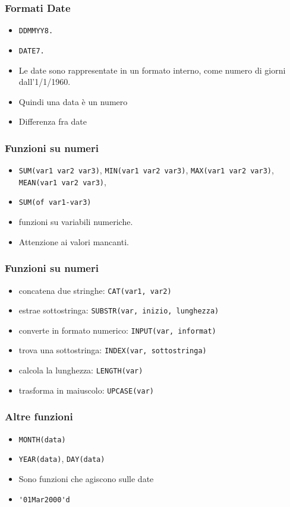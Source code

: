 \begin{frame}[fragile]\frametitle{Formati Date}
  \begin{itemize}
  \item
    \verb!DDMMYY8.!
  \item
    \verb!DATE7.!
  \item
    Le date sono rappresentate in un formato interno, come numero di giorni dall'1/1/1960.
  \item
    Quindi una data {\`e} un numero
  \item
    Differenza fra date
  \end{itemize}
\end{frame}

\begin{frame}[fragile]\frametitle{Funzioni su numeri}
  \begin{itemize}
  \item
    \verb!SUM(var1 var2 var3)!,  \verb!MIN(var1 var2 var3)!,
    \verb!MAX(var1 var2 var3)!,     \verb!MEAN(var1 var2 var3)!,
  \item
    \verb!SUM(of var1-var3)!
  \item
    funzioni su variabili numeriche.
  \item
    Attenzione ai valori mancanti.
  \end{itemize}
\end{frame}

\begin{frame}[fragile]\frametitle{Funzioni su numeri}
  \begin{itemize}
  \item
    concatena due stringhe:     \verb!CAT(var1, var2)! 
  \item
    estrae sottostringa:
    \verb!SUBSTR(var, inizio, lunghezza)!
  \item
    converte in formato numerico:
    \verb!INPUT(var, informat)!
  \item
  trova una sottostringa:
    \verb!INDEX(var, sottostringa)!
  \item
  calcola la lunghezza:
    \verb!LENGTH(var)!
  \item
  trasforma in maiuscolo:
    \verb!UPCASE(var)!
  \end{itemize}
\end{frame}

\begin{frame}[fragile]\frametitle{Altre funzioni}
  \begin{itemize}
  \item
    \verb!MONTH(data)!
  \item
    \verb!YEAR(data)!,  \verb!DAY(data)!
  \item
    Sono funzioni che agiscono sulle date
  \item
    \verb!'01Mar2000'd!
  \end{itemize}
\end{frame}



